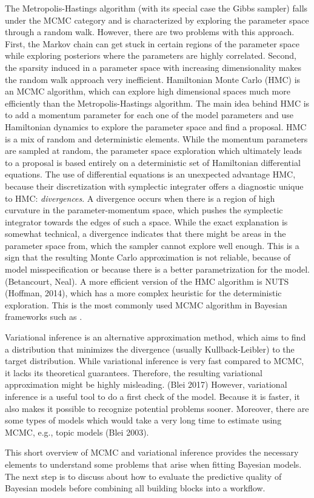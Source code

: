 The Metropolis-Hastings algorithm (with its special case the Gibbs sampler) falls under the MCMC category and is characterized by exploring the parameter space through a random walk.
However, there are two problems with this approach.
First, the Markov chain can get stuck in certain regions of the parameter space while exploring posteriors where the parameters are highly correlated.
Second, the sparsity induced in a parameter space with increasing dimensionality makes the random walk approach very inefficient.
Hamiltonian Monte Carlo (HMC) is an MCMC algorithm, which can explore high dimensional spaces much more efficiently than the Metropolis-Hastings algorithm.
The main idea behind HMC is to add a momentum parameter for each one of the model parameters and use Hamiltonian dynamics to explore the parameter space and find a proposal.
HMC is a mix of random and deterministic elements.
While the momentum parameters are sampled at random, the parameter space exploration which ultimately leads to a proposal is based entirely on a deterministic set of Hamiltonian differential equations.
The use of differential equations is an unexpected advantage HMC, because their discretization with symplectic integrater offers a diagnostic unique to HMC: \textit{divergences}.
A divergence occurs when there is a region of high curvature in the parameter-momentum space, which pushes the symplectic integrator towards the edges of such a space.
While the exact explanation is somewhat technical, a divergence indicates that there might be areas in the parameter space from, which the sampler cannot explore well enough.
This is a sign that the resulting Monte Carlo approximation is not reliable, because of model misspecification or because there is a better parametrization for the model. (Betancourt, Neal).
A more efficient version of the HMC algorithm is NUTS (Hoffman, 2014), which has a more complex heuristic for the deterministic exploration.
This is the most commonly used MCMC algorithm in Bayesian frameworks such as .

Variational inference is an alternative approximation method, which aims to find a distribution that minimizes the divergence (usually Kullback-Leibler) to the target distribution.
While variational inference is very fast compared to MCMC, it lacks its theoretical guarantees.
Therefore, the resulting variational approximation might be highly misleading. (Blei 2017)
However, variational inference is a useful tool to do a first check of the model.
Because it is faster, it also makes it possible to recognize potential problems sooner.
Moreover, there are some types of models which would take a very long time to estimate using MCMC, e.g., topic models (Blei 2003).

This short overview of MCMC and variational inference provides the necessary elements to understand some problems that arise when fitting Bayesian models.
The next step is to discuss about how to evaluate the predictive quality of Bayesian models before combining all building blocks into a workflow.

